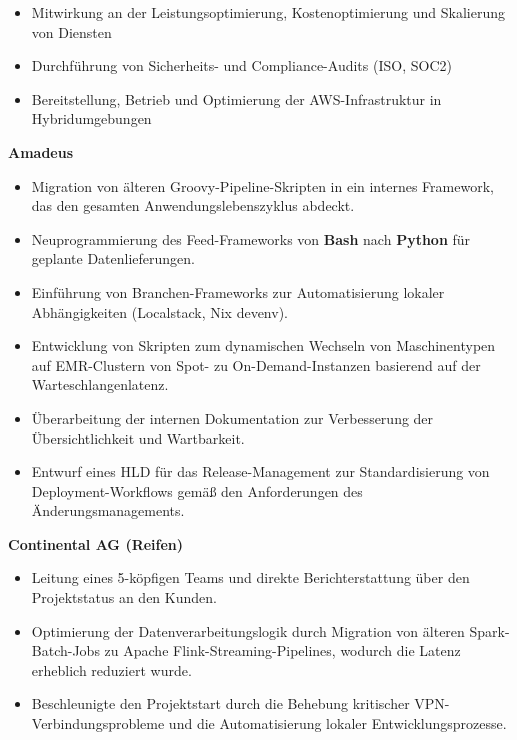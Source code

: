 
\small
\begin{itemize}[label=\tiny$\bullet$, leftmargin=1em]
	\item Mitwirkung an der Leistungsoptimierung, Kostenoptimierung und Skalierung von Diensten
	\item Durchführung von Sicherheits- und Compliance-Audits (ISO, SOC2)
	\item Bereitstellung, Betrieb und Optimierung der AWS-Infrastruktur in Hybridumgebungen
\end{itemize}


\small

\noindent \textbf{Amadeus}

\begin{itemize}[label=\tiny$\bullet$, leftmargin=1em]
	\item Migration von älteren Groovy-Pipeline-Skripten in ein internes Framework, das den gesamten Anwendungslebenszyklus abdeckt.
	\item Neuprogrammierung des Feed-Frameworks von \textbf{Bash} nach \textbf{Python} für geplante Datenlieferungen.
	\item Einführung von Branchen-Frameworks zur Automatisierung lokaler Abhängigkeiten (Localstack, Nix devenv).
	\item Entwicklung von Skripten zum dynamischen Wechseln von Maschinentypen auf EMR-Clustern von Spot- zu On-Demand-Instanzen basierend auf der Warteschlangenlatenz.
	\item Überarbeitung der internen Dokumentation zur Verbesserung der Übersichtlichkeit und Wartbarkeit.
	\item Entwurf eines HLD für das Release-Management zur Standardisierung von Deployment-Workflows gemäß den Anforderungen des Änderungsmanagements.
\end{itemize}

\vspace{3.0ex}
 {}
\small

\noindent \textbf{Continental AG (Reifen)}
\begin{itemize}[label=\tiny$\bullet$, leftmargin=1em, nosep]
	\item Leitung eines 5-köpfigen Teams und direkte Berichterstattung über den Projektstatus an den Kunden.
	\item Optimierung der Datenverarbeitungslogik durch Migration von älteren Spark-Batch-Jobs zu Apache Flink-Streaming-Pipelines, wodurch die Latenz erheblich reduziert wurde.
	\item Beschleunigte den Projektstart durch die Behebung kritischer VPN-Verbindungsprobleme und die Automatisierung lokaler Entwicklungsprozesse.
\end{itemize}

